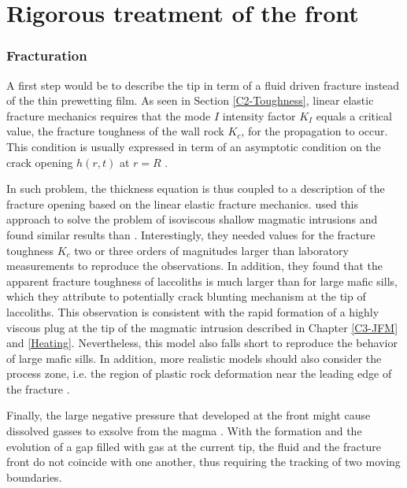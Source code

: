 \section{Rigorous treatment of the front}
\label{sec:rigor-treatm-front}

\subsubsection*{Fracturation}
\label{sec:fracturation}

A first step  would be to describe  the tip in term of  a fluid driven
fracture  instead of  the thin  prewetting  film. As  seen in  Section
\ref{C2-Toughness},  linear elastic  fracture mechanics  requires that
the  mode $I$  intensity factor  $K_I$  equals a  critical value,  the
fracture toughness  of the wall  rock $K_{c}$, for the  propagation to
occur. This  condition is usually  expressed in term of  an asymptotic
condition    on    the    crack     opening    $h(r,t)$    at    $r=R$
\citep{Savitski:2002gy,Bunger:2005em,Bunger:2007vs,Detournay:2014fk}.

In  such  problem,  the  thickness  equation  is  thus  coupled  to  a
description  of  the fracture  opening  based  on the  linear  elastic
fracture mechanics. \citet{Bunger:2011cb} used  this approach to solve
the  problem  of  isoviscous  shallow magmatic  intrusions  and  found
similar  results  than  \citet{Michaut:2011kg}.   Interestingly,  they
needed values for the fracture toughness  $K_c$ two or three orders of
magnitudes  larger  than  laboratory  measurements  to  reproduce  the
observations.   In addition,  they  found that  the apparent  fracture
toughness of  laccoliths is  much larger than  for large  mafic sills,
which they  attribute to potentially  crack blunting mechanism  at the
tip  of laccoliths.   This observation  is consistent  with the  rapid
formation  of  a highly  viscous  plug  at  the  tip of  the  magmatic
intrusion      described     in      Chapter     \ref{C3-JFM}      and
\ref{Heating}. Nevertheless, this model  also falls short to reproduce
the behavior of large mafic sills.  In addition, more realistic models
should also consider the process zone, i.e. the region of plastic rock
deformation    near    the    leading    edge    of    the    fracture
\citep{Bunger:2008cl}.

Finally, the large negative pressure that developed at the front might
cause    dissolved    gasses    to     exsolve    from    the    magma
\citep{Lister:2013ia}. With the  formation and the evolution  of a gap
filled with gas  at the current tip, the fluid  and the fracture front
do not coincide  with one another, thus requiring the  tracking of two
moving boundaries.

